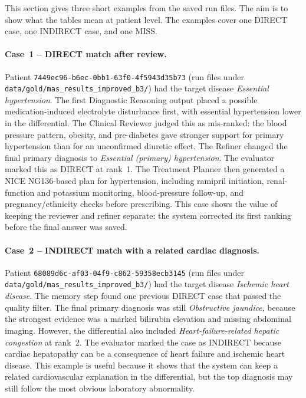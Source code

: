 This section gives three short examples from the saved run files. The aim is
to show what the tables mean at patient level. The examples cover one DIRECT
case, one INDIRECT case, and one MISS.

\paragraph{Case~1 -- DIRECT match after review.}
\begingroup\sloppy
Patient
\texttt{7449ec96-\allowbreak b6ec-\allowbreak 0bb1-\allowbreak 63f0-\allowbreak 4f5943d35b73}
(run files under
\texttt{data/\allowbreak gold/\allowbreak mas\_\allowbreak results\_\allowbreak improved\_\allowbreak b3/})
had the target disease
\textit{Essential hypertension}. The first Diagnostic Reasoning output placed a
possible medication-induced electrolyte disturbance first, with essential
hypertension lower in the differential. The Clinical Reviewer judged this as
mis-ranked: the blood pressure pattern, obesity, and pre-diabetes gave stronger
support for primary hypertension than for an unconfirmed diuretic effect. The
Refiner changed the final primary diagnosis to \textit{Essential (primary)
hypertension}. The evaluator marked this as DIRECT at rank~1. The Treatment
Planner then generated a NICE NG136-based plan for hypertension, including
ramipril initiation, renal-function and potassium monitoring, blood-pressure
follow-up, and pregnancy/ethnicity checks before prescribing. This case shows
the value of keeping the reviewer and refiner separate: the system corrected
its first ranking before the final answer was saved.
\par\endgroup

\paragraph{Case~2 -- INDIRECT match with a related cardiac diagnosis.}
\begingroup\sloppy
Patient
\texttt{68089d6c-\allowbreak af03-\allowbreak 04f9-\allowbreak c862-\allowbreak 59358ecb3145}
(run files under
\texttt{data/\allowbreak gold/\allowbreak mas\_\allowbreak results\_\allowbreak improved\_\allowbreak b3/})
had the target disease
\textit{Ischemic heart disease}. The memory step found one previous DIRECT case
that passed the quality filter. The final primary diagnosis was still
\textit{Obstructive jaundice}, because the strongest evidence was a marked
bilirubin elevation and missing abdominal imaging. However, the differential
also included \textit{Heart-failure-related hepatic congestion} at rank~2. The
evaluator marked the case as INDIRECT because cardiac hepatopathy can be a
consequence of heart failure and ischemic heart disease. This example is useful
because it shows that the system can keep a related cardiovascular explanation
in the differential, but the top diagnosis may still follow the most obvious
laboratory abnormality.
\par\endgroup

